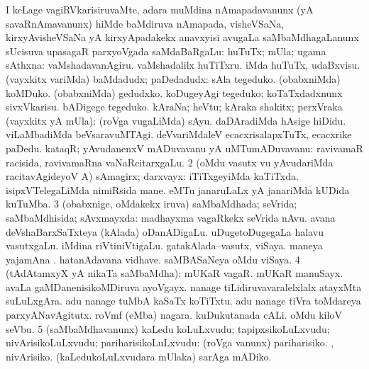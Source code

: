 \bentry
{}
\gl{\upa}
\bmng
I keLage vagiRVkarisiruvaMte, adara muMdina nAmapadavanunx (yA savaRnAmavanunx) hiMde baMdiruva nAmapada, visheVSaNa, kirxyAvisheVSaNa yA kirxyApadakekx anavxyisi avugaLa saMbaMdhagaLanunx sUcisuva upasagaR parxyoVgada saMdaBaRgaLu: 
\bnum
{} 
\banum
{} huTuTx; mUla; ugama sAthxna:  vaMshadavanAgiru.  vaMshadalilx huTiTxru.  iMda huTuTx, udaBxvisu. 
 (vayxkitx \mo variMda) baMdadudx; paDedadudx:  sAla tegeduko.  (obabxniMda) koMDuko.  (obabxniMda) gedudxko.  koDugeyAgi tegeduko; koTaTxdadxnunx sivxVkarisu.  bADigege tegeduko. 
 kAraNa; heVtu; kAraka shakitx; perxVraka (vayxkitx yA mUla):  (roVga \mo vugaLiMda) sAyu.  daDAradiMda hAsige hiDidu.  viLaMbadiMda beVsaravuMTAgi.  deVvariMdaleV ecacxrisalapxTuTx, ecacxrike paDedu. 
 kataqR; yAvudanenxV mADuvavanu yA uMTumADuvavanu:  ravivamaR racisida, ravivamaRna vaNaRcitarxgaLu. 
\eanum
\numie
\num{2} (oMdu vasutx \mo vu yAvudariMda racitavAgideyoV A) sAmagirx; darxvayx:  iTiTxgeyiMda kaTiTxda.  isipxVTelegaLiMda nimiRsida mane.  eMTu janaruLaLx yA janariMda kUDida kuTuMba. 
\num{3} (obabxnige, oMdakekx iruva) saMbaMdhada; seVrida; saMbaMdhisida; sAvxmayxda:  madhayxma vagaRkekx seVrida nAvu.  avana deVshaBarxSaTxteya (kAlada) oDanADigaLu.  uDugetoDugegaLa halavu vasutxgaLu.  iMdina riVtiniVtigaLu.  gatakAlada--vasutx, viSaya.  maneya yajamAna .  hatanAdavana vidhave.  saMBASaNeya oMdu viSaya. 
\num{4} (tAdAtamxyX yA nikaTa saMbaMdha):  mUKaR vagaR.  mUKaR manuSayx.  avaLa gaMDanenisikoMDiruva ayoVgayx.  nanage tiLidiruvavaralelxlalx atayxMta suLuLxgAra.  adu nanage tuMbA kaSaTx koTiTxtu.  adu nanage tiVra toMdareya parxyANavAgitutx.  roVmf (eMba) nagara.  kuDukutanada cALi.  oMdu kiloV seVbu. 
\num{5} (saMbaMdhavanunx) kaLedu koLuLxvudu; tapipxsikoLuLxvudu; nivArisikoLuLxvudu; pariharisikoLuLxvudu:  (roVga \mo vanunx) pariharisiko. , nivArisiko.  (kaLedukoLuLxvudara mUlaka) sarAga mADiko. 
